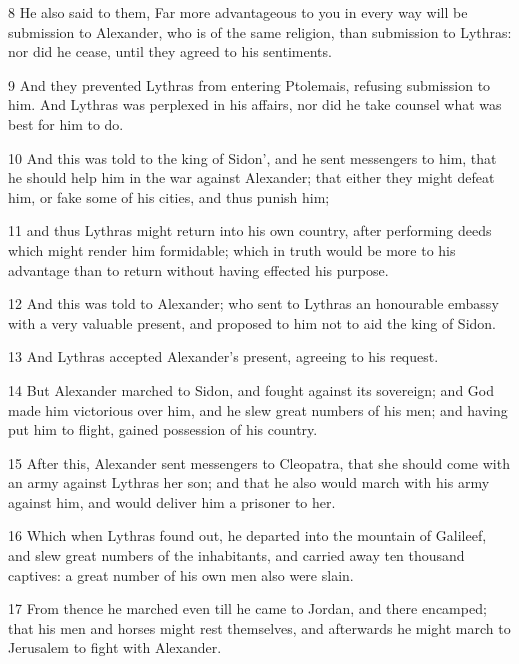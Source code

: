 \par 8 He also said to them, Far more advantageous to you in every way will be submission to Alexander, who is of the same religion, than submission to Lythras: nor did he cease, until they agreed to his sentiments. 

\par 9 And they prevented Lythras from entering Ptolemais, refusing submission to him. And Lythras was perplexed in his affairs, nor did he take counsel what was best for him to do. 

\par 10 And this was told to the king of Sidon’, and he sent messengers to him, that he should help him in the war against Alexander; that either they might defeat him, or fake some of his cities, and thus punish him; 

\par 11 and thus Lythras might return into his own country, after performing deeds which might render him formidable; which in truth would be more to his advantage than to return without having effected his purpose. 

\par 12 And this was told to Alexander; who sent to Lythras an honourable embassy with a very valuable present, and proposed to him not to aid the king of Sidon. 

\par 13 And Lythras accepted Alexander’s present, agreeing to his request. 

\par 14 But Alexander marched to Sidon, and fought against its sovereign; and God made him victorious over him, and he slew great numbers of his men; and having put him to flight, gained possession of his country. 

\par 15 After this, Alexander sent messengers to Cleopatra, that she should come with an army against Lythras her son; and that he also would march with his army against him, and would deliver him a prisoner to her. 

\par 16 Which when Lythras found out, he departed into the mountain of Galileef, and slew great numbers of the inhabitants, and carried away ten thousand captives: a great number of his own men also were slain. 

\par 17 From thence he marched even till he came to Jordan, and there encamped; that his men and horses might rest themselves, and afterwards he might march to Jerusalem to fight with Alexander. 

